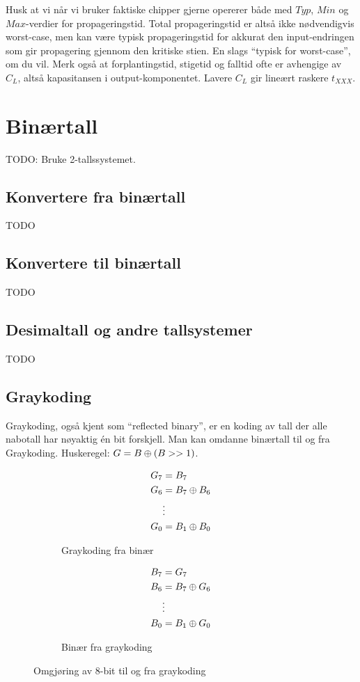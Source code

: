 \documentclass[12pt,a4paper,norsk]{article}
\begin{document}
Husk at vi når vi bruker faktiske chipper gjerne opererer
både med $Typ$, $Min$ og $Max$-verdier for propageringstid. Total
propageringstid er altså ikke nødvendigvis worst-case, men kan være typisk
propageringstid for akkurat den input-endringen som gir propagering gjennom
den kritiske stien. En slags ``typisk for worst-case'', om du vil. Merk også at
forplantingstid, stigetid og falltid ofte er avhengige av $C_{L}$, altså
kapasitansen i output-komponentet. Lavere $C_{L}$ gir lineært raskere $t_{XXX}$.

\section{Binærtall}
TODO\@: Bruke 2-tallssystemet.

\subsection{Konvertere fra binærtall}
TODO

\subsection{Konvertere til binærtall}
TODO

\subsection{Desimaltall og andre tallsystemer}
TODO

\subsection{Graykoding}
Graykoding, også kjent som ``reflected binary'', er en koding av tall der alle
nabotall har nøyaktig én bit forskjell. Man kan omdanne binærtall til og fra
Graykoding. Huskeregel: $G = B \oplus (B >> 1)$.
\begin{figure}[H]
  \centering
  \begin{subfigure}{.4\textwidth}
    \centering
    \begin{align*}
      G_{7} &= B_{7} \\
      G_{6} &= B_{7} \oplus B_{6} \\
            &\vdots \\
      G_{0} &= B_{1} \oplus B_{0} \\
    \end{align*}
    \caption{Graykoding fra binær}
  \end{subfigure}
  \begin{subfigure}{.4\textwidth}
    \centering
    \begin{align*}
      B_{7} &= G_{7} \\
      B_{6} &= B_{7} \oplus G_{6} \\
            &\vdots \\
      B_{0} &= B_{1} \oplus G_{0} \\
    \end{align*}
    \caption{Binær fra graykoding}
  \end{subfigure}
  \caption{Omgjøring av 8-bit til og fra graykoding}
\end{figure}
\end{document}
